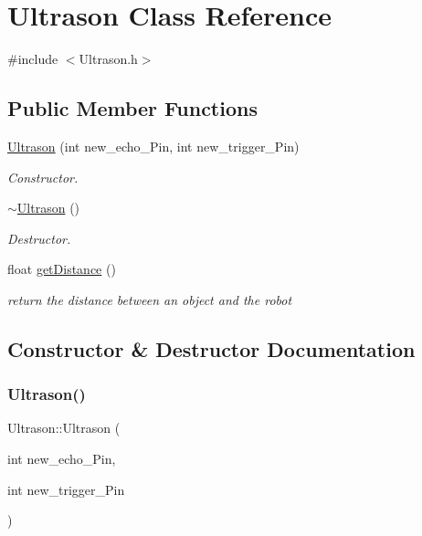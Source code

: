 \hypertarget{class_ultrason}{}\section{Ultrason Class Reference}
\label{class_ultrason}


{\ttfamily \#include $<$Ultrason.\+h$>$}

\subsection*{Public Member Functions}
\begin{DoxyCompactItemize}
\item 
\hyperlink{class_ultrason_a4d7fcddf39a81acff48688629a587822}{Ultrason} (int new\+\_\+echo\+\_\+\+Pin, int new\+\_\+trigger\+\_\+\+Pin)
\begin{DoxyCompactList}\small\item\em Constructor. \end{DoxyCompactList}\item 
\hyperlink{class_ultrason_a9ddfaa75d2d63df4a35bfe2a62a87029}{$\sim$\+Ultrason} ()
\begin{DoxyCompactList}\small\item\em Destructor. \end{DoxyCompactList}\item 
float \hyperlink{class_ultrason_ae0c4468df36bc49c31e5e8a4eb973e08}{get\+Distance} ()
\begin{DoxyCompactList}\small\item\em return the distance between an object and the robot \end{DoxyCompactList}\end{DoxyCompactItemize}


\subsection{Constructor \& Destructor Documentation}
\mbox{\label{class_ultrason_a4d7fcddf39a81acff48688629a587822}} 
\subsubsection{\texorpdfstring{Ultrason()}{Ultrason()}}
{\footnotesize\ttfamily Ultrason\+::\+Ultrason (\begin{DoxyParamCaption}\item[{int}]{new\+\_\+echo\+\_\+\+Pin,  }\item[{int}]{new\+\_\+trigger\+\_\+\+Pin }\end{DoxyParamCaption})}



